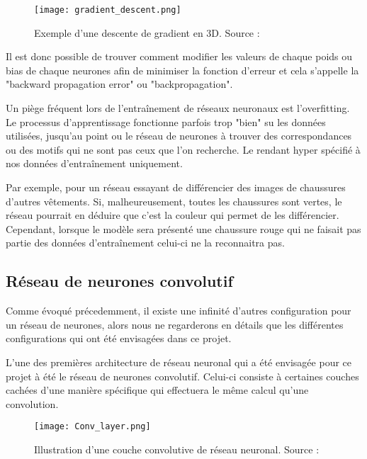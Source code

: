 \begin{figure}[tbph!]
	\centering
	\texttt{[image: gradient\_descent.png]}
	\caption[Exemple d'une descente de gradient en 3D]{Exemple d'une descente de gradient en 3D. Source : \cite{GradientDescentImage}}
\end{figure}

Il est donc possible de trouver comment modifier les valeurs de chaque poids ou bias
de chaque neurones afin de minimiser la fonction d'erreur et cela s'appelle la "backward propagation error" ou
"backpropagation".

Un piège fréquent lors de l'entraînement de réseaux neuronaux est l'overfitting. Le processus d'apprentissage fonctionne parfois trop "bien"
su les données utilisées, jusqu'au point ou le réseau de neurones à trouver des correspondances ou des motifs qui ne sont pas ceux que l'on recherche.
Le rendant hyper spécifié à nos données d'entraînement uniquement.

Par exemple, pour un réseau essayant de différencier des images de chaussures d'autres vêtements. Si, malheureusement, toutes les chaussures sont vertes,
le réseau pourrait en déduire que c'est la couleur qui permet de les différencier. Cependant, lorsque le modèle sera présenté 
une chaussure rouge qui ne faisait pas partie des données d'entraînement celui-ci ne la reconnaitra pas.

\subsection{Réseau de neurones convolutif}

Comme évoqué précedemment, il existe une infinité d'autres configuration pour un réseau de neurones, alors nous ne regarderons en détails 
que les différentes configurations qui ont été envisagées dans ce projet.

L'une des premières architecture de réseau neuronal qui a été envisagée pour ce projet à été le réseau de neurones convolutif.
Celui-ci consiste à certaines couches cachées d'une manière spécifique qui effectuera le même calcul qu'une convolution.

\begin{figure}[tbph!]
	\centering
	\texttt{[image: Conv\_layer.png]}
	\caption[Illustration d'une couche convolutive de réseau neuronal]{Illustration d'une couche convolutive de réseau neuronal. Source : \cite{ConvImage}}
\end{figure}


